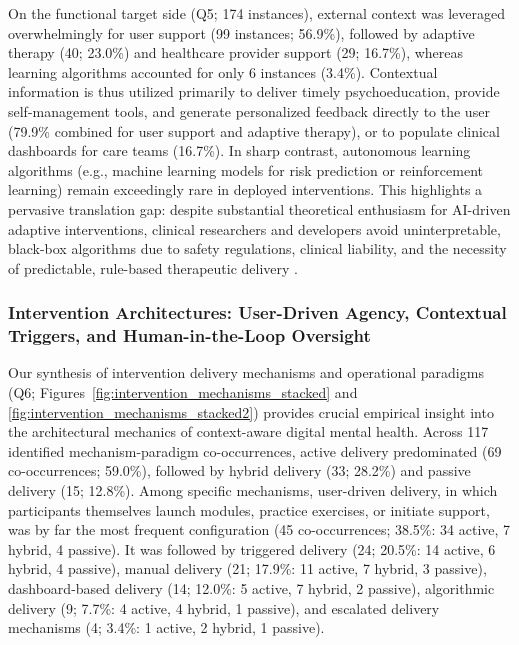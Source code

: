 On the functional target side (Q5; 174 instances), external context was leveraged overwhelmingly for user support (99 instances; 56.9\%), followed by adaptive therapy (40; 23.0\%) and healthcare provider support (29; 16.7\%), whereas learning algorithms accounted for only 6 instances (3.4\%). Contextual information is thus utilized primarily to deliver timely psychoeducation, provide self-management tools, and generate personalized feedback directly to the user (79.9\% combined for user support and adaptive therapy), or to populate clinical dashboards for care teams (16.7\%). In sharp contrast, autonomous learning algorithms (e.g., machine learning models for risk prediction or reinforcement learning) remain exceedingly rare in deployed interventions. This highlights a pervasive translation gap: despite substantial theoretical enthusiasm for AI-driven adaptive interventions, clinical researchers and developers avoid uninterpretable, black-box algorithms due to safety regulations, clinical liability, and the necessity of predictable, rule-based therapeutic delivery \cite{adler2024actionablesensing}.

\subsubsection{Intervention Architectures: User-Driven Agency, Contextual Triggers, and Human-in-the-Loop Oversight}

Our synthesis of intervention delivery mechanisms and operational paradigms (Q6; Figures~\ref{fig:intervention_mechanisms_stacked} and \ref{fig:intervention_mechanisms_stacked2}) provides crucial empirical insight into the architectural mechanics of context-aware digital mental health. Across 117 identified mechanism-paradigm co-occurrences, active delivery predominated (69 co-occurrences; 59.0\%), followed by hybrid delivery (33; 28.2\%) and passive delivery (15; 12.8\%). Among specific mechanisms, user-driven delivery, in which participants themselves launch modules, practice exercises, or initiate support, was by far the most frequent configuration (45 co-occurrences; 38.5\%: 34 active, 7 hybrid, 4 passive). It was followed by triggered delivery (24; 20.5\%: 14 active, 6 hybrid, 4 passive), manual delivery (21; 17.9\%: 11 active, 7 hybrid, 3 passive), dashboard-based delivery (14; 12.0\%: 5 active, 7 hybrid, 2 passive), algorithmic delivery (9; 7.7\%: 4 active, 4 hybrid, 1 passive), and escalated delivery mechanisms (4; 3.4\%: 1 active, 2 hybrid, 1 passive).

